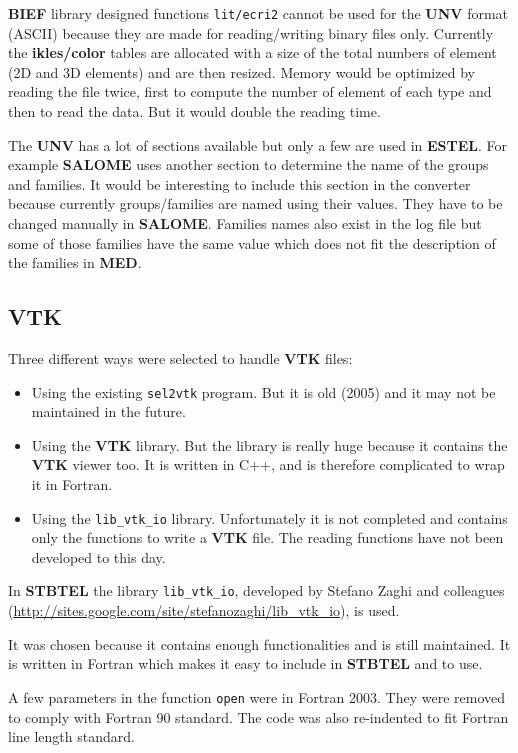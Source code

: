 \documentclass[a4paper,10pt]{article}
\newcommand{\stb}{\textbf{STBTEL}\xspace}
\newcommand{\bief}{\textbf{BIEF}\xspace}
\newcommand{\estel}{\textbf{ESTEL}\xspace}
\newcommand{\sal}{\textbf{SALOME}\xspace}
\newcommand{\unv}{\textbf{UNV}\xspace}
\newcommand{\med}{\textbf{MED}\xspace}
\newcommand{\vtk}{\textbf{VTK}\xspace}
\begin{document}
\bief library designed functions \verb+lit/ecri2+ cannot be used for the \unv format (ASCII) because they are made for reading/writing binary files only.
Currently the \textbf{ikles/color} tables are allocated with a size of the total numbers of element (2D and 3D elements) and are then resized.
Memory would be optimized by reading the file twice, first to compute the number of element of each type and
then to read the data. But it would double the reading time.

The \unv has a lot of sections available but only a few are used in \estel. For example \sal uses another section to determine the name of the groups and families.
It would be interesting to include this section in the converter because currently groups/families are named
using their values. They have to be changed manually in \sal. Families names also exist in the log file
but some of those families have the same value which does not fit the description of the families in \med.

\subsection{\vtk}

Three different ways were selected to handle \vtk files:

\begin{itemize}
\item Using the existing \verb+sel2vtk+ program. But it is old (2005) and it may not be maintained in the future.
\item Using the \vtk library. But the library is really huge because it contains the \vtk viewer too.
It is written in C++, and is therefore complicated to wrap it in Fortran.
\item Using the \verb+lib_vtk_io+ library. Unfortunately it is not completed and contains only the functions to write a \vtk file.
The reading functions have not been developed to this day.
\end{itemize}

In \stb the library \verb+lib_vtk_io+, developed by Stefano Zaghi and colleagues
(\url{http://sites.google.com/site/stefanozaghi/lib\_vtk\_io}), is used.

It was chosen because it contains enough functionalities and is still maintained. 
It is written in Fortran which makes it easy to include in \stb and to use.

A few parameters in the function \verb+open+ were in Fortran 2003. They were removed to comply with
Fortran 90 standard. The code was also re-indented to fit Fortran line length standard.
\end{document}
